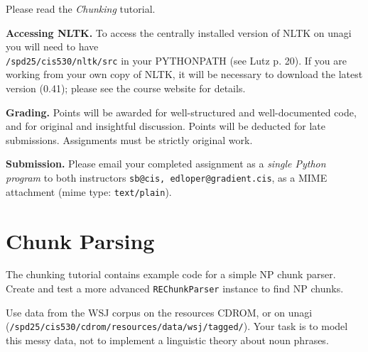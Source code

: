 \documentclass{cis530}
\begin{document}
\maketitle

Please read the \emph{Chunking} tutorial.

{\bf Accessing NLTK.}  
To access the centrally installed version of NLTK on unagi you will
need to have\\ \texttt{/spd25/cis530/nltk/src} in your PYTHONPATH (see
Lutz p. 20).  If you are working from your own copy of NLTK, it will
be necessary to download the latest version (0.41); please see the
course website for details.

{\bf Grading.}
Points will be awarded for well-structured and well-documented code,
and for original and insightful discussion.
Points will be deducted for late submissions.  Assignments must be
strictly original work.

{\bf Submission.}  
Please email your completed assignment as a
\emph{single Python program} to both instructors
\texttt{sb@cis, edloper@gradient.cis}, as a MIME attachment
(mime type: \texttt{text/plain}).
\vspace{2ex}


\section{Chunk Parsing}

  The chunking tutorial contains example code for a simple NP
  chunk parser.
  Create and test a more advanced \texttt{REChunkParser} instance
  to find NP chunks.

  Use data from the WSJ corpus on the resources CDROM, or on
  unagi (\texttt{/spd25/cis530/cdrom/resources/data/wsj/tagged/}).
  Your task is to model this messy data, not to
  implement a linguistic theory about noun phrases.
\end{document}
